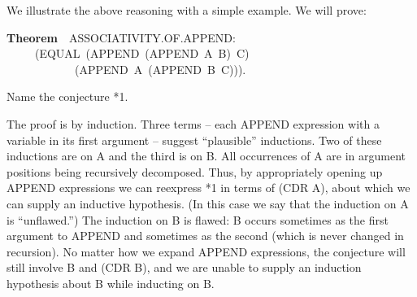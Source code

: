 \documentclass[10pt]{book}
\newenvironment{pubasis}{\begin{flushleft}}{\end{flushleft}}
\newcommand{\axiomordefinition}[1]{\vspace{6pt}\Large\textsf{\textbf{#1}}\normalsize}
\begin{document}
We illustrate the above reasoning with a simple example.
We will prove:
\begin{pubasis}
\axiomordefinition{Theorem}~~ASSOCIATIVITY.OF.APPEND:\\
~~~~~(EQUAL~(APPEND~(APPEND~A~B)~C)\\
~~~~~~~~~~~~(APPEND~A~(APPEND~B~C))).\\
\end{pubasis}
Name the conjecture *1.

The proof is by induction.  Three terms -- each APPEND
expression with a variable in its first argument -- suggest ``plausible''
inductions.  Two of these inductions are on A and the third is
on B.  All occurrences of A are in argument positions
being recursively decomposed.  Thus, by appropriately opening up
APPEND expressions we can reexpress *1 in terms of (CDR A),
about which we can supply an inductive hypothesis.  (In this case
we say that the induction on A is ``unflawed.'')
The induction on B is flawed:
B occurs sometimes as
the first argument to APPEND and sometimes as the second (which is never changed in recursion).  No
matter how we expand APPEND expressions, the conjecture will
still involve B and (CDR B), and we are unable to supply an
induction hypothesis about B while inducting on B.
\end{document}
